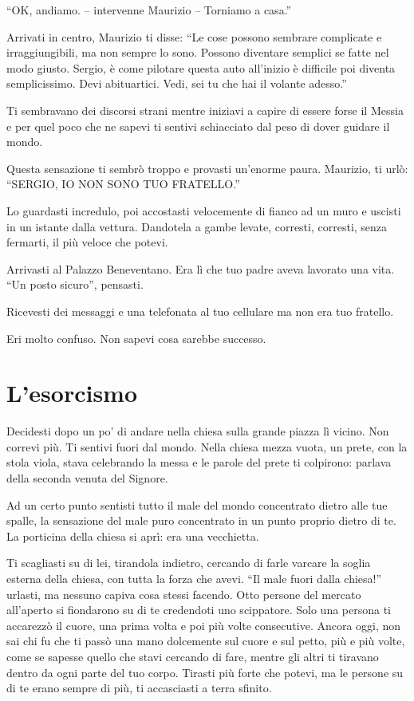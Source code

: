 “OK, andiamo. -- intervenne Maurizio -- Torniamo a casa.”

Arrivati in centro, Maurizio ti disse: “Le cose possono sembrare complicate e irraggiungibili, ma non sempre lo sono. Possono diventare semplici se fatte nel modo giusto. Sergio, è come pilotare questa auto all'inizio è difficile poi diventa semplicissimo. Devi abituartici. Vedi, sei tu che hai il volante adesso.”

Ti sembravano dei discorsi strani mentre iniziavi a capire di essere forse il Messia e per quel poco che ne sapevi ti sentivi schiacciato dal peso di dover guidare il mondo.

Questa sensazione ti sembrò troppo e provasti un'enorme paura. Maurizio, ti urlò: “SERGIO, IO NON SONO TUO FRATELLO.”

Lo guardasti incredulo, poi accostasti velocemente di fianco ad un muro e uscisti in un istante dalla vettura. Dandotela a gambe levate, corresti, corresti, senza fermarti, il più veloce che potevi.

Arrivasti al Palazzo Beneventano. Era lì che tuo padre aveva lavorato una vita. “Un posto sicuro”, pensasti.

Ricevesti dei messaggi e una telefonata al tuo cellulare ma non era tuo fratello.

Eri molto confuso. Non sapevi cosa sarebbe successo.

\section{L'esorcismo}
\label{esorcismo}

Decidesti dopo un po' di andare nella chiesa sulla grande piazza lì vicino. Non correvi più. Ti sentivi fuori dal mondo. Nella chiesa mezza vuota, un prete, con la stola viola, stava celebrando la messa e le parole del prete ti colpirono: parlava della seconda venuta del Signore.

Ad un certo punto sentisti tutto il male del mondo concentrato dietro alle tue spalle, la sensazione del male puro concentrato in un punto proprio dietro di te. La porticina della chiesa si aprì: era una vecchietta.

Ti scagliasti su di lei, tirandola indietro, cercando di farle varcare la soglia esterna della chiesa, con tutta la forza che avevi. “Il male fuori dalla chiesa!” urlasti, ma nessuno capiva cosa stessi facendo. Otto persone del mercato all'aperto si fiondarono su di te credendoti uno scippatore. Solo una persona ti accarezzò il cuore, una prima volta e poi più volte consecutive. Ancora oggi, non sai chi fu che ti passò una mano dolcemente sul cuore e sul petto, più e più volte, come se sapesse quello che stavi cercando di fare, mentre gli altri ti tiravano dentro da ogni parte del tuo corpo. Tirasti più forte che potevi, ma le persone su di te erano sempre di più, ti accasciasti a terra sfinito.

